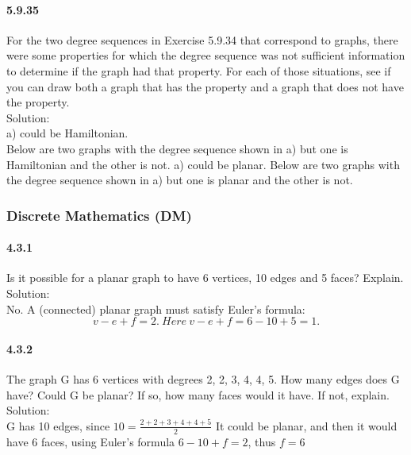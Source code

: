 \documentclass{article}
\begin{document}
\paragraph{5.9.35}
For the two degree sequences in Exercise 5.9.34 that correspond to graphs, there were some properties for which the degree sequence was not sufficient information to determine if the graph had that property. For each of those situations, see if you can draw both a graph that has the property and a graph that does not have the property.\\
Solution:\\
a) could be Hamiltonian. \\
Below are two graphs with the degree sequence shown in a) but one is Hamiltonian and the other is not. a) could be planar. Below are two graphs with the degree sequence shown in a) but one is planar and the other is not.
\subsubsection{Discrete Mathematics (DM)}
\paragraph{4.3.1}
Is it possible for a planar graph to have 6 vertices, 10 edges and 5 faces? Explain.\\
Solution:\\
No. A (connected) planar graph must satisfy Euler’s formula:
$$v - e + f = 2.\ Here \ v - e + f = 6 - 10 + 5 = 1.$$
\paragraph{4.3.2}
The graph G has 6 vertices with degrees 2, 2, 3, 4, 4, 5. How many edges does G have? Could G be planar? If so, how many faces would it have. If not, explain.\\
Solution:\\
G has 10 edges, since $10=\frac{2+2+3+4+4+5}{2}$ It could be planar, and then it would have 6 faces, using Euler’s formula $6 - 10 + f = 2$, thus $f=6$
\end{document}
